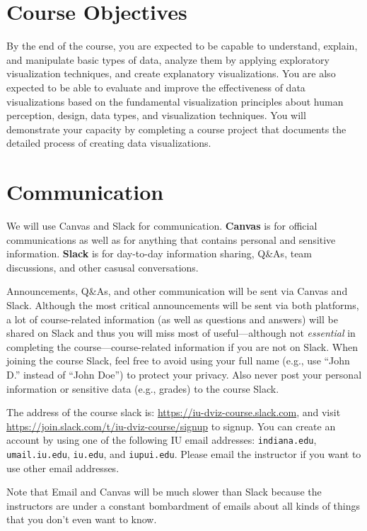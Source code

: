 \documentclass[11pt,article,oneside]{memoir} %
\begin{document}
\section{Course Objectives}%

By the end of the course, you are expected to be capable to understand, explain, and manipulate basic types of data, analyze them by applying exploratory visualization techniques, and create explanatory visualizations. 
You are also expected to be able to evaluate and improve the effectiveness of data visualizations based on the fundamental visualization principles about human perception, design, data types, and visualization techniques. 
You will demonstrate your capacity by completing a course project that documents the detailed process of creating data visualizations. 

\section{Communication} %

We will use Canvas and Slack for communication. \textbf{Canvas} is for official communications as well as for anything that contains personal and sensitive information. \textbf{Slack} is for day-to-day information sharing, Q\&As, team discussions, and other casusal conversations. 

Announcements, Q\&As, and other communication will be sent via Canvas and Slack. Although the most critical announcements will be sent via both platforms, a lot of course-related information (as well as questions and answers) will be shared on Slack and thus you will miss most of useful---although not \emph{essential} in completing the course---course-related information if you are not on Slack. 
When joining the course Slack, feel free to avoid using your full name (e.g., use ``John D.'' instead of ``John Doe'') to protect your privacy. 
Also never post your personal information or sensitive data (e.g., grades) to the course Slack. 

The address of the course slack is: \url{https://iu-dviz-course.slack.com}, and visit \url{https://join.slack.com/t/iu-dviz-course/signup} to signup.
You can create an account by using one of the following IU email addresses: \texttt{indiana.edu}, \texttt{umail.iu.edu}, \texttt{iu.edu}, and \texttt{iupui.edu}. Please email the instructor if you want to use other email addresses. 

Note that Email and Canvas will be much slower than Slack because the instructors are under a constant bombardment of emails about all kinds of things that you don't even want to know. 
\end{document}
